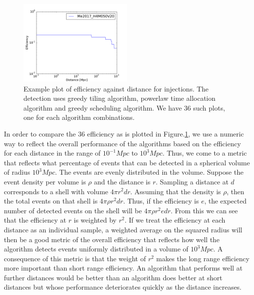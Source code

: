 \documentclass[twocolumn]{aastex61}
\begin{document}
\begin{figure}[t]
\centering
\includegraphics[width=0.5\textwidth]{plots/eff_ex.pdf}
\caption{Example plot of efficiency against distance for \cite{Me2017} injections. The detection uses greedy tiling algorithm, powerlaw time allocation algorithm and greedy scheduling algorithm. We have 36 such plots, one for each algorithm combinations.}
\label{fig:eff_ex}
\end{figure}
In order to compare the 36 efficiency as is plotted in Figure.\ref{fig:eff_ex}, we use a numeric way to reflect the overall performance of the algorithms based on the efficiency for each distance in the range of $10^{-1} Mpc$ to $10^3 Mpc$. Thus, we come to a metric that reflects what percentage of events that can be detected in a spherical volume of radius $10^3 Mpc$. The events are evenly distributed in the volume. Suppose the event density per volume is $\rho$ and the distance is $r$. Sampling a distance at $d$ corresponds to a shell with volume $4 \pi r^2 dr$. Assuming that the density is $\rho$, then the total events on that shell is $4 \pi \rho r^2 dr$. Thus, if the efficiency is $e$, the expected number of detected events on the shell will be $4 \pi \rho r^2 e dr$. From this we can see that the efficiency at $r$ is weighted by $r^2$. If we treat the efficiency at each distance as an individual sample, a weighted average on the squared radius will then be a good metric of the overall efficiency that reflects how well the algorithm detects events uniformly distributed in a volume of $10^3 Mpc$. A consequence of this metric is that the weight of $r^2$ makes the long range efficiency more important than short range efficiency. An algorithm that performs well at further distances would be better than an algorithm does better at short distances but whose performance deteriorates quickly as the distance increases.
\end{document}
